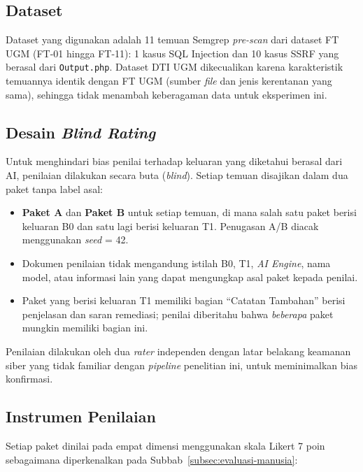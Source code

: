 \subsection{Dataset}

Dataset yang digunakan adalah 11 temuan Semgrep \textit{pre-scan} dari 
dataset FT UGM (FT-01 hingga FT-11): 1 kasus SQL Injection dan 10 kasus 
SSRF yang berasal dari \texttt{Output.php}. Dataset DTI UGM 
dikecualikan karena karakteristik temuannya identik dengan FT UGM 
(sumber \textit{file} dan jenis kerentanan yang sama), sehingga tidak 
menambah keberagaman data untuk eksperimen ini.

\subsection{Desain \textit{Blind Rating}}

Untuk menghindari bias penilai terhadap keluaran yang diketahui 
berasal dari AI, penilaian dilakukan secara buta (\textit{blind}). 
Setiap temuan disajikan dalam dua paket tanpa label asal:

\begin{itemize}
    \item \textbf{Paket A} dan \textbf{Paket B} untuk setiap temuan, 
    di mana salah satu paket berisi keluaran B0 dan satu lagi berisi 
    keluaran T1. Penugasan A/B diacak menggunakan \textit{seed} = 42.
    \item Dokumen penilaian tidak mengandung istilah B0, T1, 
    \textit{AI Engine}, nama model, atau informasi lain yang dapat 
    mengungkap asal paket kepada penilai.
    \item Paket yang berisi keluaran T1 memiliki bagian 
    ``Catatan Tambahan'' berisi penjelasan dan saran remediasi; 
    penilai diberitahu bahwa \textit{beberapa} paket mungkin memiliki 
    bagian ini.
\end{itemize}

Penilaian dilakukan oleh dua \textit{rater} independen dengan latar 
belakang keamanan siber yang tidak familiar dengan \textit{pipeline} 
penelitian ini, untuk meminimalkan bias konfirmasi.

\subsection{Instrumen Penilaian}

Setiap paket dinilai pada empat dimensi menggunakan skala Likert 
7 poin \cite{likert1932technique} sebagaimana diperkenalkan pada 
Subbab~\ref{subsec:evaluasi-manusia}:


